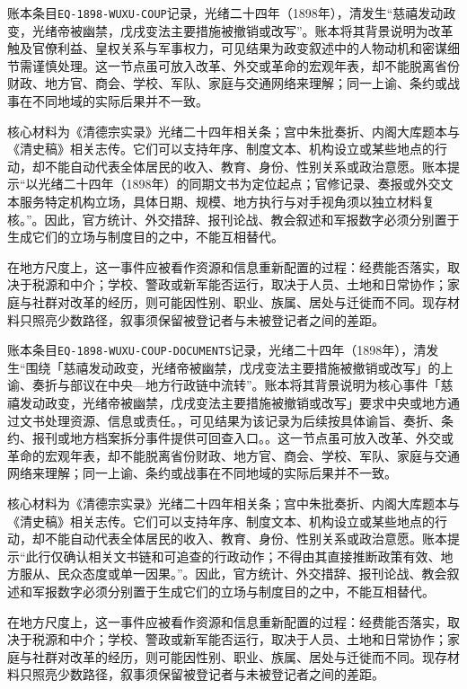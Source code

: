 账本条目\texttt{EQ-1898-WUXU-COUP}记录，光绪二十四年（1898年），清发生“慈禧发动政变，光绪帝被幽禁，戊戌变法主要措施被撤销或改写”。账本将其背景说明为改革触及官僚利益、皇权关系与军事权力，可见结果为政变叙述中的人物动机和密谋细节需谨慎处理。这一节点虽可放入改革、外交或革命的宏观年表，却不能脱离省份财政、地方官、商会、学校、军队、家庭与交通网络来理解；同一上谕、条约或战事在不同地域的实际后果并不一致。

核心材料为《清德宗实录》光绪二十四年相关条；宫中朱批奏折、内阁大库题本与《清史稿》相关志传。它们可以支持年序、制度文本、机构设立或某些地点的行动，却不能自动代表全体居民的收入、教育、身份、性别关系或政治意愿。账本提示“以光绪二十四年（1898年）的同期文书为定位起点；官修记录、奏报或外交文本服务特定机构立场，具体日期、规模、地方执行与对手视角须以独立材料复核。”。因此，官方统计、外交措辞、报刊论战、教会叙述和军报数字必须分别置于生成它们的立场与制度目的之中，不能互相替代。

在地方尺度上，这一事件应被看作资源和信息重新配置的过程：经费能否落实，取决于税源和中介；学校、警政或新军能否运行，取决于人员、土地和日常协作；家庭与社群对改革的经历，则可能因性别、职业、族属、居处与迁徙而不同。现存材料只照亮少数路径，叙事须保留被登记者与未被登记者之间的差距。

账本条目\texttt{EQ-1898-WUXU-COUP-DOCUMENTS}记录，光绪二十四年（1898年），清发生“围绕「慈禧发动政变，光绪帝被幽禁，戊戌变法主要措施被撤销或改写」的上谕、奏折与部议在中央—地方行政链中流转”。账本将其背景说明为核心事件「慈禧发动政变，光绪帝被幽禁，戊戌变法主要措施被撤销或改写」要求中央或地方通过文书处理资源、信息或责任。，可见结果为该记录为后续按具体谕旨、奏折、条约、报刊或地方档案拆分事件提供可回查入口。。这一节点虽可放入改革、外交或革命的宏观年表，却不能脱离省份财政、地方官、商会、学校、军队、家庭与交通网络来理解；同一上谕、条约或战事在不同地域的实际后果并不一致。

核心材料为《清德宗实录》光绪二十四年相关条；宫中朱批奏折、内阁大库题本与《清史稿》相关志传。它们可以支持年序、制度文本、机构设立或某些地点的行动，却不能自动代表全体居民的收入、教育、身份、性别关系或政治意愿。账本提示“此行仅确认相关文书链和可追查的行政动作；不得由其直接推断政策有效、地方服从、民众态度或单一因果。”。因此，官方统计、外交措辞、报刊论战、教会叙述和军报数字必须分别置于生成它们的立场与制度目的之中，不能互相替代。

在地方尺度上，这一事件应被看作资源和信息重新配置的过程：经费能否落实，取决于税源和中介；学校、警政或新军能否运行，取决于人员、土地和日常协作；家庭与社群对改革的经历，则可能因性别、职业、族属、居处与迁徙而不同。现存材料只照亮少数路径，叙事须保留被登记者与未被登记者之间的差距。


